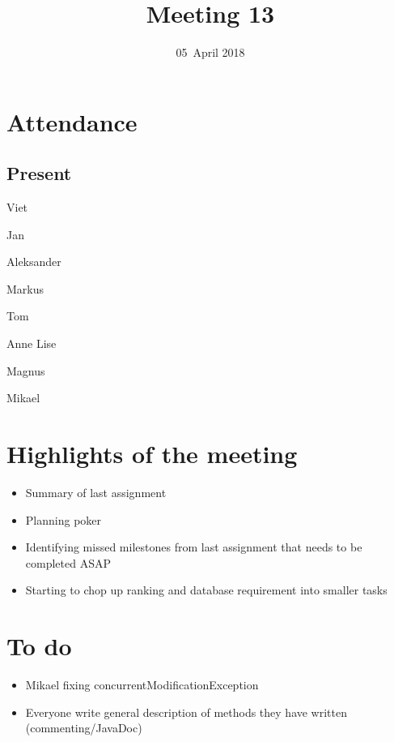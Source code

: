 \documentclass[letterpaper,11pt]{article}
\title{Meeting 13}
\date{05~April 2018}
\begin{document}
\maketitle
\section*{Attendance}
\subsection*{Present}
\begin{list}{}{}
	\item Viet
	\item Jan
	\item Aleksander
	\item Markus
	\item Tom
	\item Anne Lise
	\item Magnus
	\item Mikael
\end{list}

\newpage
\section*{Highlights of the meeting}
\begin{itemize}
	\item Summary of last assignment
	\item Planning poker
	\item Identifying missed milestones from last assignment that needs to be completed ASAP
	\item Starting to chop up ranking and database requirement into smaller tasks
\end{itemize}

\section*{To do}
\begin{itemize}
	\item Mikael fixing concurrentModificationException
	\item Everyone write general description of methods they have written (commenting/JavaDoc)
\end{itemize}
\end{document}
